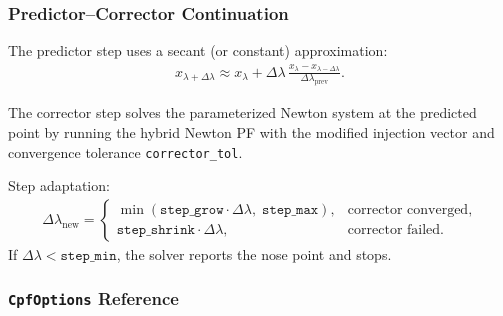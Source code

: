\subsubsection{Predictor--Corrector Continuation}

The predictor step uses a secant (or constant) approximation:
\begin{align}
x_{\lambda+\Delta\lambda} \approx x_\lambda + \Delta\lambda\,\frac{x_\lambda - x_{\lambda-\Delta\lambda}}{\Delta\lambda_{\mathrm{prev}}}.
\end{align}

The corrector step solves the parameterized Newton system at the predicted point
by running the hybrid Newton PF with the modified injection vector and
convergence tolerance \texttt{corrector\_tol}.

Step adaptation:
\begin{align}
\Delta\lambda_{\mathrm{new}} =
\begin{cases}
\min(\texttt{step\_grow}\cdot\Delta\lambda,\;\texttt{step\_max}), & \text{corrector converged,} \\
\texttt{step\_shrink}\cdot\Delta\lambda, & \text{corrector failed.}
\end{cases}
\end{align}
If \(\Delta\lambda < \texttt{step\_min}\), the solver reports the nose point
and stops.

\subsubsection{\texttt{CpfOptions} Reference}

